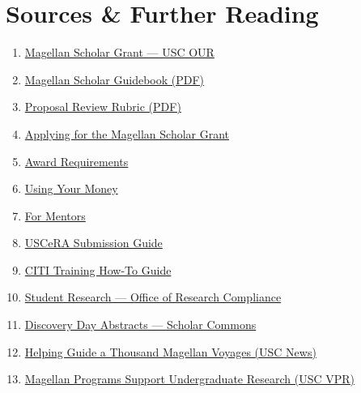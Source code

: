 \documentclass[11pt, letterpaper]{article}
\begin{document}
\section{Sources \& Further Reading}

\begin{enumerate}[nosep]
    \item \href{https://sc.edu/about/offices_and_divisions/undergraduate_research/funding_opportunities/our_funding/magellan-scholar-award/}{Magellan Scholar Grant --- USC OUR}
    \item \href{https://sc.edu/about/offices_and_divisions/undergraduate_research/documents/mgs_guidebook.pdf}{Magellan Scholar Guidebook (PDF)}
    \item \href{https://www.sc.edu/about/offices_and_divisions/undergraduate_research/documents/mgs_review_rubric.pdf}{Proposal Review Rubric (PDF)}
    \item \href{https://sc.edu/about/offices_and_divisions/undergraduate_research/apply_for_funding/our_funding/magellan-scholar-award/applying/index.php}{Applying for the Magellan Scholar Grant}
    \item \href{https://sc.edu/about/offices_and_divisions/undergraduate_research/apply_for_funding/our_funding/magellan-scholar-award/award-requirements/index.php}{Award Requirements}
    \item \href{https://sc.edu/about/offices_and_divisions/undergraduate_research/apply_for_funding/our_funding/magellan-scholar-award/using-your-money/index.php}{Using Your Money}
    \item \href{https://sc.edu/about/offices_and_divisions/undergraduate_research/apply_for_funding/our_funding/magellan-scholar-award/for-mentors/index.php}{For Mentors}
    \item \href{https://sc.edu/about/offices_and_divisions/undergraduate_research/documents/mgs_uscera-guide.pdf}{USCeRA Submission Guide}
    \item \href{https://sc.edu/about/offices_and_divisions/undergraduate_research/documents/cititraininghowto.pdf}{CITI Training How-To Guide}
    \item \href{https://sc.edu/about/offices_and_divisions/research_compliance/irb/student_research.php}{Student Research --- Office of Research Compliance}
    \item \href{https://scholarcommons.sc.edu/discoveryday/}{Discovery Day Abstracts --- Scholar Commons}
    \item \href{https://sc.edu/uofsc/posts/2014/02_julie_morris_undergraduate_research_1000_magellan.php}{Helping Guide a Thousand Magellan Voyages (USC News)}
    \item \href{https://www.sc.edu/about/offices_and_divisions/research/news_and_pubs/news/2017/20170921_magellan_programs.php}{Magellan Programs Support Undergraduate Research (USC VPR)}
\end{enumerate}
\end{document}
